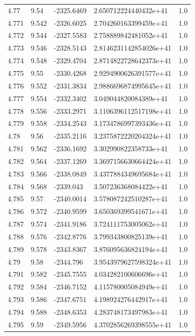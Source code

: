 \begin{tabular}{lllll}
4.77 & 9.54 & -2325.6469 & 2.650712224440432e+41 & 1.0 \\
4.771 & 9.542 & -2326.6025 & 2.704260163399459e+41 & 1.0 \\
4.772 & 9.544 & -2327.5583 & 2.758889842481052e+41 & 1.0 \\
4.773 & 9.546 & -2328.5143 & 2.8146231142854026e+41 & 1.0 \\
4.774 & 9.548 & -2329.4704 & 2.8714822728642373e+41 & 1.0 \\
4.775 & 9.55 & -2330.4268 & 2.9294900626391577e+41 & 1.0 \\
4.776 & 9.552 & -2331.3834 & 2.9886696874995645e+41 & 1.0 \\
4.777 & 9.554 & -2332.3402 & 3.049044820084389e+41 & 1.0 \\
4.778 & 9.556 & -2333.2971 & 3.1106396112517198e+41 & 1.0 \\
4.779 & 9.558 & -2334.2543 & 3.1734786997393436e+41 & 1.0 \\
4.78 & 9.56 & -2335.2116 & 3.2375872220204324e+41 & 1.0 \\
4.781 & 9.562 & -2336.1692 & 3.302990822358733e+41 & 1.0 \\
4.782 & 9.564 & -2337.1269 & 3.3697156630664424e+41 & 1.0 \\
4.783 & 9.566 & -2338.0849 & 3.4377884349695684e+41 & 1.0 \\
4.784 & 9.568 & -2339.043 & 3.507236368084422e+41 & 1.0 \\
4.785 & 9.57 & -2340.0014 & 3.578087242510287e+41 & 1.0 \\
4.786 & 9.572 & -2340.9599 & 3.650369399541671e+41 & 1.0 \\
4.787 & 9.574 & -2341.9186 & 3.724111753005062e+41 & 1.0 \\
4.788 & 9.576 & -2342.8776 & 3.799343800825139e+41 & 1.0 \\
4.789 & 9.578 & -2343.8367 & 3.876095636824194e+41 & 1.0 \\
4.79 & 9.58 & -2344.796 & 3.9543979627598324e+41 & 1.0 \\
4.791 & 9.582 & -2345.7555 & 4.034282100606696e+41 & 1.0 \\
4.792 & 9.584 & -2346.7152 & 4.115780005084949e+41 & 1.0 \\
4.793 & 9.586 & -2347.6751 & 4.198924276442917e+41 & 1.0 \\
4.794 & 9.588 & -2348.6353 & 4.283748173497983e+41 & 1.0 \\
4.795 & 9.59 & -2349.5956 & 4.3702856269398555e+41 & 1.0 \\

\end{tabular}
